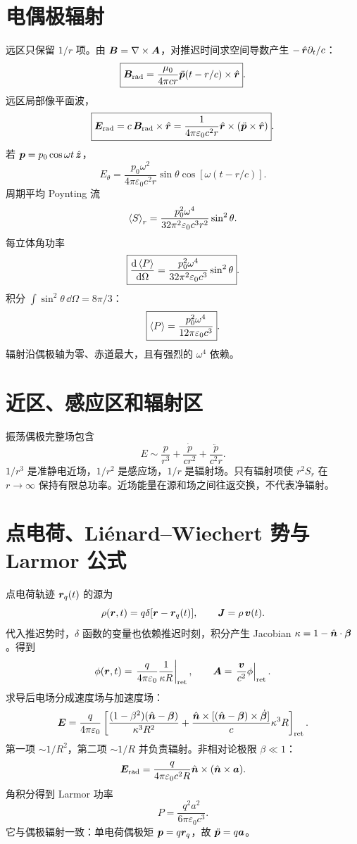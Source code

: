 \section{电偶极辐射}
远区只保留 $1/r$ 项。由
$\bm{B}=\nabla\times\bm{A}$，对推迟时间求空间导数产生
$-\,\hat{\bm{r}}\partial_t/c$：
\[
\boxed{\bm{B}_{\rm rad}
=\frac{\mu_0}{4\pi cr}
\ddot{\bm{p}}(t-r/c)\times\hat{\bm{r}}}.
\]
远区局部像平面波，
\[
\boxed{\bm{E}_{\rm rad}
=c\,\bm{B}_{\rm rad}\times\hat{\bm{r}}
=\frac1{4\pi\varepsilon_0c^2r}
\hat{\bm{r}}\times(\ddot{\bm{p}}\times\hat{\bm{r}})}.
\]
若 $\bm{p}=p_0\cos\omega t\,\hat{\bm{z}}$，
\[
E_\theta=\frac{p_0\omega^2}{4\pi\varepsilon_0c^2r}
\sin\theta\cos[\omega(t-r/c)].
\]
周期平均 Poynting 流
\[
\left\langle S\right\rangle_r=\frac{p_0^2\omega^4}{32\pi^2
\varepsilon_0c^3r^2}\sin^2\theta.
\]
每立体角功率
\[
\boxed{\frac{\mathrm d \left\langle P\right\rangle}{\mathrm d \Omega}
=\frac{p_0^2\omega^4}{32\pi^2\varepsilon_0c^3}
\sin^2\theta}.
\]
积分
$\int\sin^2\theta\,\dd\Omega=8\pi/3$：
\[
\boxed{\left\langle P\right\rangle
=\frac{p_0^2\omega^4}{12\pi\varepsilon_0c^3}}.
\]
辐射沿偶极轴为零、赤道最大，且有强烈的 $\omega^4$ 依赖。

\section{近区、感应区和辐射区}
振荡偶极完整场包含
\[
E\sim\frac p{r^3}
+\frac{\dot p}{cr^2}
+\frac{\ddot p}{c^2r}.
\]
$1/r^3$ 是准静电近场，$1/r^2$ 是感应场，$1/r$ 是辐射场。只有辐射项使
$r^2S_r$ 在 $r\to\infty$ 保持有限总功率。近场能量在源和场之间往返交换，不代表净辐射。

\section{点电荷、Liénard--Wiechert 势与 Larmor 公式}
点电荷轨迹 $\bm{r}_q(t)$ 的源为
\[
\rho(\bm{r},t)=q\delta[\bm{r}-\bm{r}_q(t)],
\qquad
\bm{J}=\rho\,\bm{v}(t).
\]
代入推迟势时，$\delta$ 函数的变量也依赖推迟时刻，积分产生 Jacobian
$\kappa=1-\hat{\bm{n}}\cdot\bm{\beta}$。得到
\[
\phi(\bm{r},t)=
\left.\frac{q}{4\pi\varepsilon_0}
\frac1{\kappa R}\right|_{\rm ret},
\qquad
\bm{A}=\left.\frac{\bm{v}}{c^2}\phi\right|_{\rm ret}.
\]
求导后电场分成速度场与加速度场：
\[
\bm{E}=
\frac{q}{4\pi\varepsilon_0}
\left[
\frac{(1-\beta^2)(\hat{\bm{n}}-\bm{\beta})}
{\kappa^3R^2}
+\frac{\hat{\bm{n}}\times[
(\hat{\bm{n}}-\bm{\beta})\times\dot{\bm{\beta}}]}
c{\kappa^3R}
\right]_{\rm ret}.
\]
第一项 $\sim1/R^2$，第二项 $\sim1/R$ 并负责辐射。非相对论极限
$\beta\ll1$：
\[
\bm{E}_{\rm rad}
=\frac{q}{4\pi\varepsilon_0c^2R}
\hat{\bm{n}}\times(\hat{\bm{n}}\times\bm{a}).
\]
角积分得到 Larmor 功率
\[
\boxed{P=\frac{q^2a^2}{6\pi\varepsilon_0c^3}}.
\]
它与偶极辐射一致：单电荷偶极矩 $\bm{p}=q\bm{r}_q$，故
$\ddot{\bm{p}}=q\bm{a}$。

